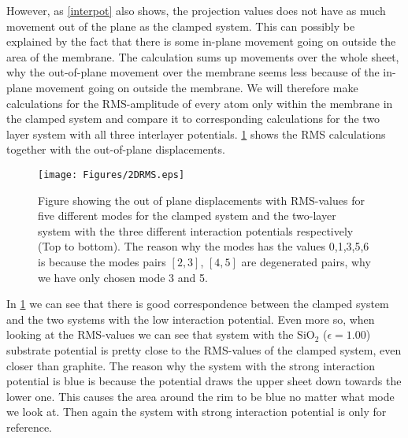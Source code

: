 However, as \cref{interpot} also shows, the projection values does not have as much movement out of the plane as the clamped system. This can possibly be explained by the fact that there is some in-plane movement going on outside the area of the membrane. The calculation sums up movements over the whole sheet, why the out-of-plane movement over the membrane seems less because of the in-plane movement going on outside the membrane. We will therefore make calculations for the RMS-amplitude of every atom only within the membrane in the clamped system and compare it to corresponding calculations for the two layer system with all three interlayer potentials. \cref{2DRMS} shows the RMS calculations together with the out-of-plane displacements.
\onecolumngrid

\begin{figure}[H]
    \centering
    \texttt{[image: Figures/2DRMS.eps]}
    \caption{Figure showing the out of plane displacements with RMS-values for five different modes for the clamped system and the two-layer system with the three different interaction potentials respectively (Top to bottom). The reason why the modes has the values 0,1,3,5,6 is because the modes pairs $[2,3]$, $[4,5]$ are degenerated pairs, why we have only chosen mode 3 and 5.}
    \label{2DRMS}
\end{figure}
\twocolumngrid

In \cref{2DRMS} we can see that there is good correspondence between the clamped system and the two systems with the low interaction potential. Even more so, when looking at the RMS-values we can see that system with the $\text{SiO}_{2}$ ($\epsilon=1.00$) substrate potential is pretty close to the RMS-values of the clamped system, even closer than graphite. The reason why the system with the strong interaction potential is blue is because the potential draws the upper sheet down towards the lower one. This causes the area around the rim to be blue no matter what mode we look at. Then again the system with strong interaction potential is only for reference.

